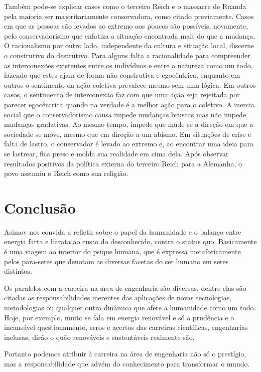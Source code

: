 \documentclass[14pt,portuguese]{extreport}
\begin{document}
      Também pode-se explicar casos como o terceiro Reich e o massacre
      de Ruanda pela maioria ser majoritariamente conservadora, como
      citado previamente. Casos em que as pessoas são levados ao extremo
      aos poucos são possíveis, novamente, pelo conservadorismo que
      enfatiza a situação encontrada mais do que a mudança. O racionalismo
      por outro lado, independente da cultura e situação local, discerne o
      construtivo do destrutivo. Para alguns falta a racionalidade para
      compreender as interconexões existentes entre os indivíduos e entre a
      natureza como um todo, fazendo que estes ajam de forma não
      construtiva e egocêntrica, enquanto em outros o sentimento da ação
      coletiva prevalece mesmo sem uma lógica. Em outros casos, o
      sentimento de interconexão faz com que uma ação seja rejeitada por
      parecer egocêntrica quando na verdade é a melhor ação para o coletivo.
      A inercia social que o conservadorismo causa impede mudanças bruscas
      mas não impede mudanças gradativas. Ao mesmo tempo, impede que
      mude-se a direção em que a sociedade se move, mesmo que em direção
      a um abismo. Em situações de crise e falta de lastro, o conservador é
      levado ao extremo e, ao encontrar uma ideia para se lastrear, fica preso
      e molda sua realidade em cima dela. Após observar resultados positivos
      da política externa do terceiro Reich para a Alemanha, o povo assumiu
      o Reich como sua religião.
      
  \chapter{Conclusão}

   Asimov nos convida a refletir sobre o papel da humanidade e o balanço entre energia farta e barata ao custo do desconhecido, 
   contra o status quo. Basicamente é uma viagem ao interior do psique humana, que é expressa metaforicamente pelos para-seres que 
   denotam as diversas facetas do ser humano em seres distintos. 

   Os paralelos com a carreira na área de engenharia são diversas, dentre elas são citadas as responsabilidades inerentes das aplicações 
   de novas tecnologias, metodologias ou qualquer outra dinâmica que afete a humanidade como um todo. Hoje, por exemplo, muito se fala em 
   energia renovável e só a prudência e o incansável questionamento, erros e acertos das carreiras científicas, engenharias inclusas, dirão 
   o quão renováveis e sustentáveis realmente são. 

   Portanto podemos atribuir à carreira na área de engenharia não só o prestígio, mas a responsabilidade que advém do conhecimento para transformar o mundo.
   
\end{document}
